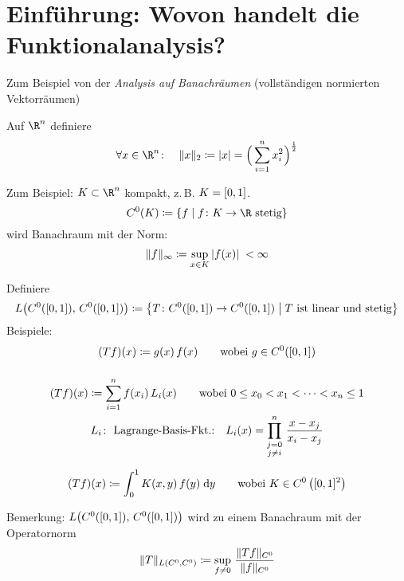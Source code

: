 \chapter{Einführung: Wovon handelt die Funktionalanalysis?}
Zum Beispiel von der \emph{Analysis auf Banachräumen}
(vollständigen normierten Vektorräumen)

\begin{thEmpty}
    Auf $\R^n$ definiere
    \[ \forall x\in\R^n\colon\quad 
        \norm{x}_2 \defeq \abs{x} = \Bigl(\, \isum^n x_i^2 \mkern1mu\Bigr)^{\half}
    \]
\end{thEmpty}

\begin{thEmpty}\hbreak
    Zum Beispiel: $K\subset\R^n$ kompakt, z.\,B. $K=[0,1]$.
    \[ C^0(K) \defeq \{ f \Mid f\colon K\to\R \text{ stetig} \} \]
    wird Banachraum mit der Norm:
    \[ \lVert f\rVert_\infty \coloneqq  \sup_{x\in K} \, \lvert f(x)\rvert \;<\infty \]
\end{thEmpty}

\begin{thEmpty}\hbreak
    Definiere
    \[ L\bigl( C^0(\I),\,C^0(\I) \bigr) \defeq
        \left\{ T\colon C^0(\I) \to C^0(\I) \Mid
            T \text{ ist linear und stetig} 
        \right\}
    \]
    Beispiele:
    \begin{gather*}
        (Tf)(x) \coloneqq g(x)\,f(x) \qquad \text{wobei $g\in C^0([0,1])$}
        \\[3ex]
        (Tf)(x) \coloneqq \sum_{i=1}^n f(x_i)\,L_i(x) \qquad\text{wobei } 
        0 \leq x_0 < x_1 < \dots < x_n \leq 1
        \\
        L_i\colon \text{ Lagrange-Basis-Fkt.:}\quad
        L_i(x) = \prod_{\substack{j=0\\j\neq i}}^n \, \frac{x-x_j}{x_i-x_j}
        \\[1.5ex]
        (Tf)(x) \coloneqq \int_0^1 K(x,y)\,f(y)\;\mathrm{d} y \qquad
        \text{wobei } K\in C^0\left([0,1]^2\right)
    \end{gather*}
\end{thEmpty}

Bemerkung: $L\bigl( C^0([0,1]),\,C^0([0,1]) \bigr)$ wird zu einem Banachraum mit
der Operatornorm
\[ \lVert T\rVert_{L(C^0,C^0)} \coloneqq \sup_{f\neq0}\,
    \frac{\lVert Tf\rVert_{C^0}}{\lVert f\rVert_{C^0}}
\]

